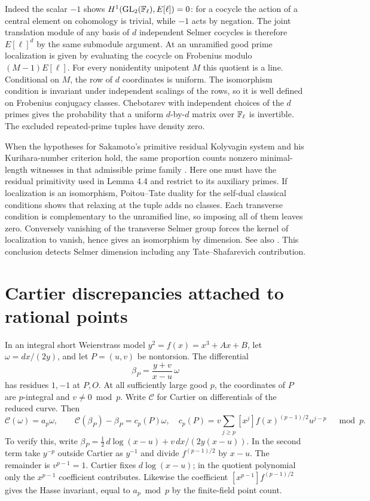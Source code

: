 \documentclass[11pt]{article}
\begin{document}
Indeed the scalar $-1$ shows $H^1(\mathrm{GL}_2(\mathbb F_\ell),E[\ell])=0$: for a cocycle the action of a central element on cohomology is trivial, while $-1$ acts by negation. The joint translation module of any basis of $d$ independent Selmer cocycles is therefore $E[\ell]^d$ by the same submodule argument. At an unramified good prime localization is given by evaluating the cocycle on Frobenius modulo $(M-1)E[\ell]$. For every nonidentity unipotent $M$ this quotient is a line. Conditional on $M$, the row of $d$ coordinates is uniform. The isomorphism condition is invariant under independent scalings of the rows, so it is well defined on Frobenius conjugacy classes. Chebotarev with independent choices of the $d$ primes gives the probability that a uniform $d$-by-$d$ matrix over $\mathbb F_\ell$ is invertible. The excluded repeated-prime tuples have density zero.

When the hypotheses for Sakamoto's primitive residual Kolyvagin system and his Kurihara-number criterion hold, the same proportion counts nonzero minimal-length witnesses in that admissible prime family \cite[Lemmas 4.4, 4.6]{Sakamoto}. Here one must have the residual primitivity used in Lemma 4.4 and restrict to its auxiliary primes. If localization is an isomorphism, Poitou--Tate duality for the self-dual classical conditions shows that relaxing at the tuple adds no classes. Each transverse condition is complementary to the unramified line, so imposing all of them leaves zero. Conversely vanishing of the transverse Selmer group forces the kernel of localization to vanish, hence gives an isomorphism by dimension. See also \cite[Thm.~1.10]{Kim}. This conclusion detects Selmer dimension including any Tate--Shafarevich contribution.

\section{Cartier discrepancies attached to rational points}
In an integral short Weierstrass model $y^2=f(x)=x^3+Ax+B$, let $\omega=dx/(2y)$, and let $P=(u,v)$ be nontorsion. The differential
\[
 \beta_P=\frac{y+v}{x-u}\,\omega
\]
has residues $1,-1$ at $P,O$. At all sufficiently large good $p$, the coordinates of $P$ are $p$-integral and $v\ne0\bmod p$. Write $\mathcal C$ for Cartier on differentials of the reduced curve. Then
\[
 \mathcal C(\omega)=a_p\omega,\qquad
 \mathcal C(\beta_P)-\beta_P=c_p(P)\omega,\quad
 c_p(P)=v\sum_{j\ge p}[x^j]f(x)^{(p-1)/2}u^{j-p}\quad\bmod p .
\]
To verify this, write $\beta_P=\tfrac12\,d\log(x-u)+v\,dx/(2y(x-u))$. In the second term take $y^{-p}$ outside Cartier as $y^{-1}$ and divide $f^{(p-1)/2}$ by $x-u$. The remainder is $v^{p-1}=1$. Cartier fixes $d\log(x-u)$; in the quotient polynomial only the $x^{p-1}$ coefficient contributes. Likewise the coefficient $[x^{p-1}]f^{(p-1)/2}$ gives the Hasse invariant, equal to $a_p\bmod p$ by the finite-field point count.
\end{document}
